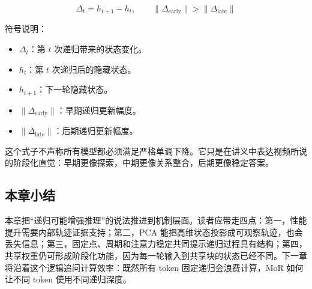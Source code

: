 \[
\Delta_t=h_{t+1}-h_t,\qquad \lVert \Delta_{\mathrm{early}}\rVert>\lVert \Delta_{\mathrm{late}}\rVert
\]

符号说明：
\begin{itemize}
  \item \(\Delta_t\)：第 \(t\) 次递归带来的状态变化。
  \item \(h_t\)：第 \(t\) 次递归后的隐藏状态。
  \item \(h_{t+1}\)：下一轮隐藏状态。
  \item \(\lVert \Delta_{\mathrm{early}}\rVert\)：早期递归更新幅度。
  \item \(\lVert \Delta_{\mathrm{late}}\rVert\)：后期递归更新幅度。
\end{itemize}

这个式子不声称所有模型都必须满足严格单调下降。它只是在讲义中表达视频所说的阶段化直觉：早期更像探索，中期更像关系整合，后期更像稳定答案。

\subsection{本章小结}

本章把“递归可能增强推理”的说法推进到机制层面。读者应带走四点：第一，性能提升需要内部轨迹证据支持；第二，PCA 能把高维状态投影成可观察轨迹，也会丢失信息；第三，固定点、周期和注意力稳定共同提示递归过程具有结构；第四，共享权重仍可形成阶段化功能，因为每一轮输入到共享块的状态已经不同。下一章将沿着这个逻辑追问计算效率：既然所有 token 固定递归会浪费计算，MoR 如何让不同 token 使用不同递归深度。
